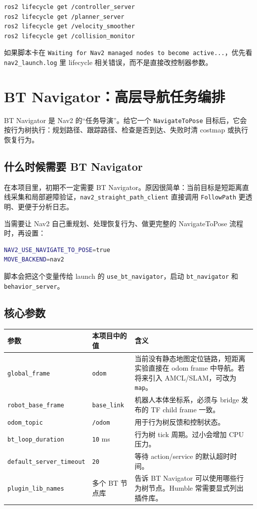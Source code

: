 \documentclass[UTF8,11pt,a4paper,openany]{ctexrep}
\newcommand{\code}[1]{\nolinkurl{#1}}
\newcommand{\topic}[1]{\nolinkurl{#1}}
\newcommand{\param}[1]{\nolinkurl{#1}}
\newcommand{\file}[1]{\nolinkurl{#1}}
\newcommand{\pkg}[1]{\nolinkurl{#1}}
\newcommand{\actionname}[1]{\nolinkurl{#1}}
\begin{document}
\begin{lstlisting}[language=bash]
ros2 lifecycle get /controller_server
ros2 lifecycle get /planner_server
ros2 lifecycle get /velocity_smoother
ros2 lifecycle get /collision_monitor
\end{lstlisting}

如果脚本卡在 \code{Waiting for Nav2 managed nodes to become active...}，优先看 \file{nav2_launch.log} 里 lifecycle 相关错误，而不是直接改控制器参数。

\section{BT Navigator：高层导航任务编排}

BT Navigator 是 Nav2 的“任务导演”。给它一个 \actionname{NavigateToPose} 目标后，它会按行为树执行：规划路径、跟踪路径、检查是否到达、失败时清 costmap 或执行恢复行为。

\subsection{什么时候需要 BT Navigator}

在本项目里，初期不一定需要 BT Navigator。原因很简单：当前目标是短距离直线采集和局部避障验证，\pkg{nav2_straight_path_client} 直接调用 \actionname{FollowPath} 更透明、更便于分析日志。

当需要让 Nav2 自己重规划、处理恢复行为、做更完整的 NavigateToPose 流程时，再设置：

\begin{lstlisting}[language=bash]
NAV2_USE_NAVIGATE_TO_POSE=true
MOVE_BACKEND=nav2
\end{lstlisting}

脚本会把这个变量传给 launch 的 \param{use_bt_navigator}，启动 \pkg{bt_navigator} 和 \pkg{behavior_server}。

\subsection{核心参数}

\begin{longtable}{L{0.28\textwidth}L{0.20\textwidth}L{0.42\textwidth}}
\toprule
参数 & 本项目中的值 & 含义 \\
\midrule
\param{global_frame} & \code{odom} & 当前没有静态地图定位链路，短距离实验直接在 odom frame 中导航。若将来引入 AMCL/SLAM，可改为 \code{map}。 \\
\param{robot_base_frame} & \code{base_link} & 机器人本体坐标系，必须与 bridge 发布的 TF child frame 一致。 \\
\param{odom_topic} & \topic{/odom} & 用于行为树反馈和控制状态。 \\
\param{bt_loop_duration} & \code{10} ms & 行为树 tick 周期。过小会增加 CPU 压力。 \\
\param{default_server_timeout} & \code{20} & 等待 action/service 的默认超时时间。 \\
\param{plugin_lib_names} & 多个 BT 节点库 & 告诉 BT Navigator 可以使用哪些行为树节点。Humble 常需要显式列出插件库。 \\
\bottomrule
\end{longtable}
\end{document}
